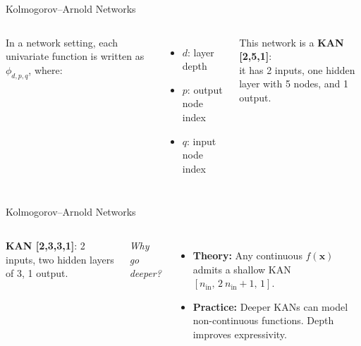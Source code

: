 \documentclass[aspectratio=169]{beamer}
\begin{document}
\begin{frame}{Kolmogorov–Arnold Networks}
	
	\begin{columns}[T,onlytextwidth]
		
		\centering
		\resizebox{!}{0.8\textheight}{}
		
		In a network setting, each univariate function is written as $\phi_{d,p,q}$, where:
		\vspace{0.8em}
		\begin{itemize}
			\item $d$: layer depth  
			\item $p$: output node index  
			\item $q$: input node index
		\end{itemize}
		
		\vspace{1em}
		This network is a \textbf{KAN [2,5,1]}:\\it has 2 inputs, one hidden layer with 5 nodes, and 1 output.
		
	\end{columns}
	
\end{frame}


\begin{frame}{Kolmogorov–Arnold Networks}
	\begin{columns}[T,onlytextwidth]
		
		\column{0.5\textwidth}
		\centering
		\resizebox{!}{0.8\textheight}{}
		
		\column{0.45\textwidth}
		\textbf{KAN [2,3,3,1]}: 2 inputs, two hidden layers of 3, 1 output.
		
		\vspace{0.8em}
		\textit{Why go deeper?}
		\begin{itemize}
			\item \textbf{Theory:} Any continuous $f(\mathbf{x})$ admits a shallow KAN $[n_{\text{in}},\,2\ n_{\text{in}} + 1,\,1]$.
			\item \textbf{Practice:} Deeper KANs can model non-continuous functions. Depth improves expressivity.
		\end{itemize}
		
	\end{columns}
\end{frame}
\end{document}
